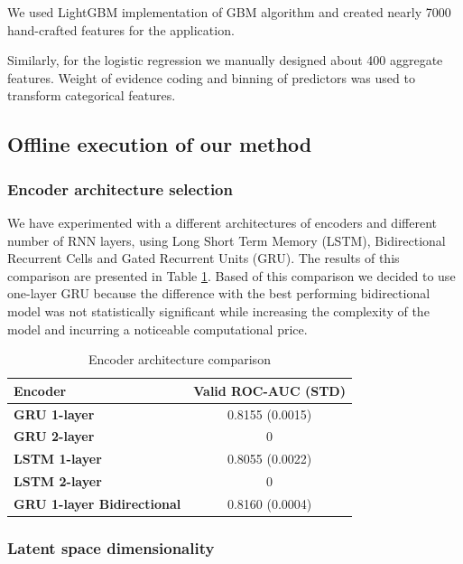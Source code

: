 \documentclass[sigconf]{acmart}
\begin{document}
We used LightGBM\cite{Ke2017LightGBMAH} implementation of GBM algorithm and created nearly 7000 hand-crafted features for the application.

Similarly, for the logistic regression we manually designed about 400 aggregate features. Weight of evidence coding and binning of predictors \cite{lund2016woe} was used to transform categorical features.

\subsection{Offline execution of our method} \label{sec-exec}

\subsubsection{Encoder architecture selection} \label{sec-arc-sel}

We have experimented with a different architectures of encoders and different number of RNN layers, using Long Short Term Memory (LSTM), Bidirectional Recurrent Cells \cite{schuster1997bidirectional} and Gated Recurrent Units (GRU). The results of this comparison are presented in Table \ref{tab-enc-arch}. Based of this comparison we decided to use one-layer GRU because the difference with the best performing bidirectional model was not statistically significant while increasing the complexity of the model and incurring a noticeable computational price.

\begin{table}[ht]
\caption{Encoder architecture comparison}
\begin{tabular}{ | l | c |  }
\hline
\textbf{Encoder} & \textbf{Valid ROC-AUC (STD)} \\
\hline
\textbf{GRU 1-layer} & 0.8155 (0.0015)  \\
\textbf{GRU 2-layer} & 0  \\
\textbf{LSTM 1-layer} & 0.8055 (0.0022) \\
\textbf{LSTM 2-layer} & 0  \\
\textbf{GRU 1-layer Bidirectional} & 0.8160 (0.0004)  \\
\hline
\end{tabular}
\label{tab-enc-arch}
\end{table}


\subsubsection{Latent space dimensionality}
\end{document}
